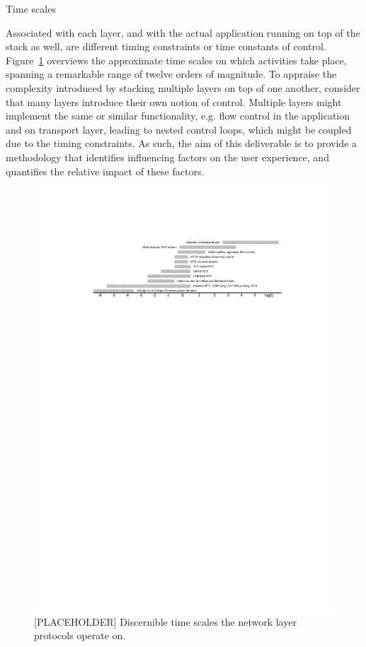 Time scales



Associated with each layer, and with the actual application running on top of the stack as well, are different timing constraints or time constants of control. Figure~\ref{c5:fig:timescales} overviews the approximate time scales on which activities take place, spanning a remarkable range of twelve orders of magnitude.
To appraise the complexity introduced by stacking multiple layers on top of one another, consider that many layers introduce their own notion of control. Multiple layers might implement the same or similar functionality, e.g. flow control in the application and on transport layer, leading to nested control loops, which might be coupled due to the timing constraints. As such, the aim of this deliverable is to provide a methodology that identifies influencing factors on the user experience, and quantifies the relative impact of these factors.

\begin{figure}[htb]
	\centering
	\includegraphics[width=\textwidth]{images/timescales-placeholder.pdf}
	\caption{[PLACEHOLDER] Discernible time scales the network layer protocols operate on.}
\label{c5:fig:timescales}
\end{figure}

